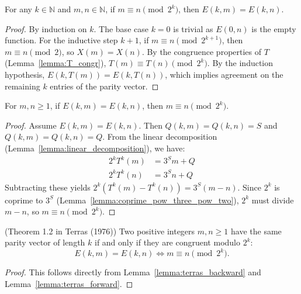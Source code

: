 \begin{lemma}\label{lemma:terras_backward}\leanok
For any $k \in \mathbb{N}$ and $m, n \in \mathbb{N}$, if $m \equiv n \pmod{2^k}$, then $E(k, m) = E(k, n)$.
\end{lemma}
\begin{proof}\leanok
By induction on $k$. The base case $k=0$ is trivial as $E(0, n)$ is the empty function. For the inductive step $k+1$, if $m \equiv n \pmod{2^{k+1}}$, then $m \equiv n \pmod 2$, so $X(m) = X(n)$. By the congruence properties of $T$ (Lemma~\ref{lemma:T_congr}), $T(m) \equiv T(n) \pmod{2^k}$. By the induction hypothesis, $E(k, T(m)) = E(k, T(n))$, which implies agreement on the remaining $k$ entries of the parity vector.
\end{proof}

\begin{lemma}\label{lemma:terras_forward}\leanok
For $m, n \ge 1$, if $E(k, m) = E(k, n)$, then $m \equiv n \pmod{2^k}$.
\end{lemma}
\begin{proof}\leanok
Assume $E(k, m) = E(k, n)$. Then $Q(k, m) = Q(k, n) = S$ and $Q(k, m) = Q(k, n) = Q$. From the linear decomposition (Lemma~\ref{lemma:linear_decomposition}), we have:
\begin{align*}
    2^k T^k(m) &= 3^S m + Q \\
    2^k T^k(n) &= 3^S n + Q
\end{align*}
Subtracting these yields $2^k (T^k(m) - T^k(n)) = 3^S (m - n)$. Since $2^k$ is coprime to $3^S$ (Lemma~\ref{lemma:coprime_pow_three_pow_two}), $2^k$ must divide $m - n$, so $m \equiv n \pmod{2^k}$.
\end{proof}

\begin{theorem}\label{theorem:terras_periodicity}\leanok
(Theorem 1.2 in Terras (1976)\cite{terras76}) Two positive integers $m, n \ge 1$ have the same parity vector of length $k$ if and only if they
are congruent modulo $2^k$:
\begin{equation}
    E(k, m) = E(k, n) \iff m \equiv n \pmod{2^k}.
\end{equation}
\end{theorem}
\begin{proof}\leanok
This follows directly from Lemma~\ref{lemma:terras_backward} and Lemma~\ref{lemma:terras_forward}.
\end{proof}
